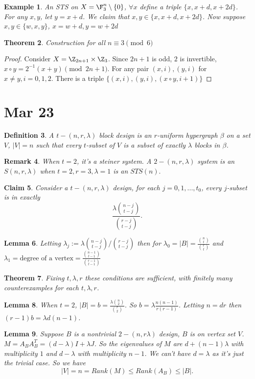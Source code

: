 \documentclass[a4paper]{article}
\newtheorem{thm}{Theorem}[section]
\newtheorem{lem}[thm]{Lemma}
\newtheorem{defn}[thm]{Definition}
\newtheorem{eg}[thm]{Example}
\newtheorem{claim}[thm]{Claim}
\newtheorem{rmk}[thm]{Remark}
\begin{document}
\begin{eg}
    An STS on $X=\F_3^n \setminus \{0\}$, $\forall x$ define a triple $ \{x,x+d,x+2d\}$. For any $x,y$, let $y=x+d$. We claim that $x,y\in \{x,x+d,x+2d\}$. Now suppose $x,y\in \{w,x,y\}$, $x=w+d, y=w+2d$
\end{eg}
\begin{thm}
    Construction for all $n\equiv 3 \pmod 6$
\end{thm}
\begin{proof}
    Consider $X=\Z_{2n+1}\times \Z_3$. Since $2n+1$ is odd, $2$ is invertible, $x\circ y= 2^{-1}(x+y) \pmod {2n+1}$. For any pair $(x,i), (y,i)$ for $x\neq y,i=0,1,2$. There is a triple $ \{(x,i),(y,i),(x\circ y, i+1)\}$
\end{proof}
\newpage
\section{Mar 23}
\begin{defn}
    A $t-(n,r,\lambda)$ block design is an $r$-uniform hypergraph $\beta$ on a set $V$, $|V|=n$ such that every $t$-subset of $V$ is a subset of exactly $\lambda$ blocks in $\beta$. 
\end{defn}
\begin{rmk}
    When $t=2$, it's a steiner system. A $2-(n,r,\lambda)$ system is an $S(n,r,\lambda)$ when $t=2,r=3,\lambda=1$ is an $STS(n).$
\end{rmk}
\begin{claim}
    Consider a $t-(n,r,\lambda)$ design, for each $j=0,1,...,t_0$, every $j$-subset is in exactly 
    \[
    \frac{\lambda \binom{n-j}{t-j}}{\binom{r-j}{t-j}}
    .\] 
\end{claim}
\begin{lem}
    Letting $\lambda_j:=\lambda \binom{n-j}{t-j}/\binom{r-j}{t-j}$ then for $\lambda_0=|B|=\frac{\binom{n}{t}}{\binom{r}{t}}$ and $\lambda_1= \text{degree of a vertex}=\frac{\binom{n-1}{t-1}}{\binom{r-1}{t-1}}$
\end{lem}
\begin{thm}
    Fixing $t,\lambda, r$ these conditions are sufficient, with finitely many counterexamples for each $t,\lambda,r$. 
\end{thm}
\begin{lem}
    When $t=2$, $|B|=b=\frac{\lambda \binom{n}{2}}{\binom{r}{2}}.$ So $b=\lambda \frac{n(n-1)}{r(r-1)}$. Letting $n=dr$ then $(r-1)b=\lambda d(n-1)$. 
\end{lem}
\begin{lem}
    Suppose $B$ is a nontrivial $2-(n,r\lambda)$ design, $B$ is on vertex set $V$. $M=A_BA_B^T=(d-\lambda)I+\lambda J$. So the eigenvalues of $M$ are $d+(n-1)\lambda$ with multiplicity $1$ and $d-\lambda$ with multiplicity $n-1$. We can't have $d=\lambda$ as it's just the trivial case. So we have \[
    |V|=n=Rank(M)\leq Rank(A_B)\leq |B|
    .\] 
\end{lem}
\end{document}

